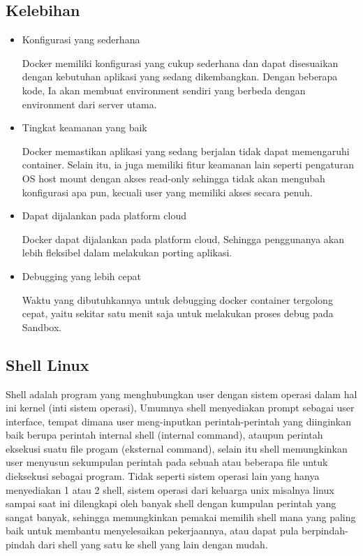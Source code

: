 \subsection{Kelebihan}
\begin{itemize}
  \item Konfigurasi yang sederhana
  
  Docker memiliki konfigurasi yang cukup sederhana dan dapat disesuaikan dengan kebutuhan aplikasi yang sedang dikembangkan.
  Dengan beberapa kode, Ia akan membuat environment sendiri yang berbeda dengan environment dari server utama.

  \item Tingkat keamanan yang baik
  
  Docker memastikan aplikasi yang sedang berjalan tidak dapat memengaruhi container.
  Selain itu, ia juga memiliki fitur keamanan lain seperti pengaturan OS host mount dengan akses read-only sehingga tidak akan mengubah konfigurasi apa pun,
  kecuali user yang memiliki akses secara penuh.

  \item Dapat dijalankan pada platform cloud
  
  Docker dapat dijalankan pada platform cloud, Sehingga penggunanya akan lebih fleksibel dalam melakukan porting aplikasi.

  \item Debugging yang lebih cepat
  
  Waktu yang dibutuhkannya untuk debugging docker container tergolong cepat, yaitu sekitar satu menit saja untuk melakukan proses debug pada Sandbox.

\end{itemize}

\subsection{Shell Linux}

Shell adalah program yang menghubungkan user dengan sistem operasi dalam hal ini kernel (inti sistem operasi),
Umumnya shell menyediakan prompt sebagai user interface, tempat dimana user meng-inputkan perintah-perintah yang diinginkan baik berupa perintah internal shell (internal command),
ataupun perintah eksekusi suatu file progam (eksternal command), selain itu shell memungkinkan user menyusun sekumpulan perintah pada sebuah atau beberapa file untuk dieksekusi sebagai program.
Tidak seperti sistem operasi lain yang hanya menyediakan 1 atau 2 shell, sistem operasi dari keluarga unix misalnya linux sampai saat ini dilengkapi oleh banyak shell dengan kumpulan perintah yang sangat banyak, sehingga memungkinkan pemakai memilih shell mana yang paling baik untuk membantu menyelesaikan pekerjaannya, atau dapat pula berpindah-pindah dari shell yang satu ke shell yang lain dengan mudah.

